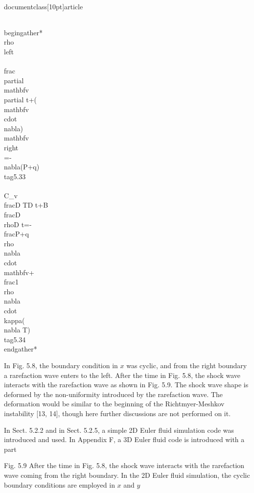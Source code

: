 \\documentclass[10pt]{article}
\begin{document}
{\\begin{gather*}
\\rho\\left\\{\\frac{\\partial \\mathbf{v}}{\\partial t}+(\\mathbf{v} \\cdot \\nabla) \\mathbf{v}\\right\\}=-\\nabla(P+q)  \\tag{5.33}\\\\
C_{v} \\frac{D T}{D t}+B \\frac{D \\rho}{D t}=-\\frac{P+q}{\\rho} \\nabla \\cdot \\mathbf{v}+\\frac{1}{\\rho} \\nabla \\cdot \\kappa(\\nabla T) \\tag{5.34}
\\end{gather*}


In Fig. 5.8, the boundary condition in $x$ was cyclic, and from the right boundary a rarefaction wave enters to the left. After the time in Fig. 5.8, the shock wave interacts with the rarefaction wave as shown in Fig. 5.9. The shock wave shape is deformed by the non-uniformity introduced by the rarefaction wave. The deformation would be similar to the beginning of the Richtmyer-Meshkov instability [13, 14], though here further discussions are not performed on it.

In Sect. 5.2.2 and in Sect. 5.2.5, a simple 2D Euler fluid simulation code was introduced and used. In Appendix F, a 3D Euler fluid code is introduced with a part

Fig. 5.9 After the time in Fig. 5.8, the shock wave interacts with the rarefaction wave coming from the right boundary. In the 2D Euler fluid simulation, the cyclic boundary conditions are employed in $x$ and $y$

}
\end{document}
